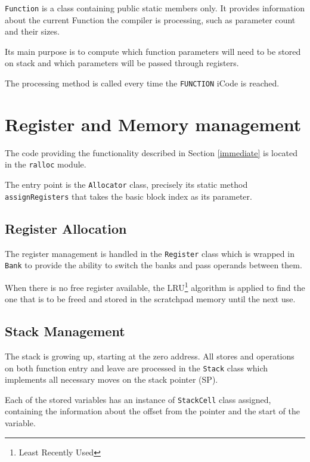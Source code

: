         \texttt{Function} is a class containing public static members only. It provides information about the current Function the compiler is processing, such as parameter count and their sizes.

        Its main purpose is to compute which function parameters will need to be stored on stack and which parameters will be passed through registers.

        The processing method is called every time the \texttt{FUNCTION} iCode is reached.

    \section{Register and Memory management}

    The code providing the functionality described in Section \ref{immediate} is located in the \texttt{ralloc} module.

    The entry point is the \texttt{Allocator} class, precisely its static method \texttt{assignRegisters} that takes the basic block index as its parameter.

        \subsection{Register Allocation}

        The register management is handled in the \texttt{Register} class which is wrapped in \texttt{Bank} to provide the ability to switch the banks and pass operands between them.

        When there is no free register available, the LRU\footnote{Least Recently Used} algorithm is applied to find the one that is to be freed and stored in the scratchpad memory until the next use.

        \subsection{Stack Management}\label{stack}

        The stack is growing up, starting at the zero address. All stores and operations on both function entry and leave are processed in the \texttt{Stack} class which implements all necessary moves on the stack pointer (SP).

        Each of the stored variables has an instance of \texttt{StackCell} class assigned, containing the information about the offset from the pointer and the start of the variable.

